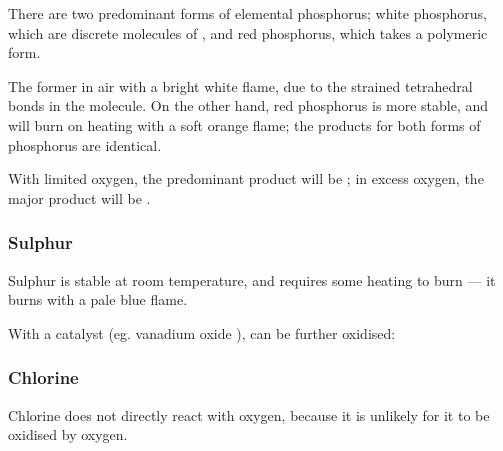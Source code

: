 				There are two predominant forms of elemental phosphorus; white phosphorus, which are discrete molecules of , and red
				phosphorus, which takes a polymeric form.

				The former  in air with a bright white flame, due to the strained tetrahedral bonds in the molecule.
				On the other hand, red phosphorus is more stable, and will burn on heating with a soft orange flame; the products for both
				forms of phosphorus are identical.


				With limited oxygen, the predominant product will be ; in excess oxygen, the major product will be .


			\pagebreak
			\subsubsection{Sulphur}

				Sulphur is stable at room temperature, and requires some heating to burn --- it burns with a pale blue flame.


				With a catalyst (eg. vanadium oxide ),  can be further oxidised:



			\subsubsection{Chlorine}

				Chlorine does not directly react with oxygen, because it is unlikely for it to be oxidised by oxygen.



